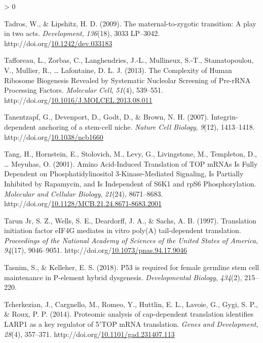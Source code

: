 \documentclass[12pt,oneside]{reedthesis}
\newlength{\cslhangindent}
\newenvironment{CSLReferences}[2] %
 {%
  \setlength{\parindent}{0pt}
  \ifodd #1 \everypar{\setlength{\hangindent}{\cslhangindent}}\ignorespaces\fi
  \ifnum #2 > 0
  \setlength{\parskip}{#2\baselineskip}
  \fi
 }%
 {}
\begin{document}
\begin{CSLReferences}{1}{0}
\leavevmode\hypertarget{ref-Tadros2009c}{}%
Tadros, W., \& Lipshitz, H. D. (2009). The maternal-to-zygotic transition: A play in two acts. \emph{Development}, \emph{136}(18), 3033 LP--3042. http://doi.org/\href{https://doi.org/10.1242/dev.033183}{10.1242/dev.033183}

\leavevmode\hypertarget{ref-Tafforeau2013a}{}%
Tafforeau, L., Zorbas, C., Langhendries, J.-L., Mullineux, S.-T., Stamatopoulou, V., Mullier, R., \ldots{} Lafontaine, D. L. J. (2013). The {Complexity} of {Human Ribosome Biogenesis Revealed} by {Systematic Nucleolar Screening} of {Pre}-{rRNA Processing Factors}. \emph{Molecular Cell}, \emph{51}(4), 539--551. http://doi.org/\href{https://doi.org/10.1016/J.MOLCEL.2013.08.011}{10.1016/J.MOLCEL.2013.08.011}

\leavevmode\hypertarget{ref-tanentzapfIntegrindependentAnchoringStemcell2007}{}%
Tanentzapf, G., Devenport, D., Godt, D., \& Brown, N. H. (2007). Integrin-dependent anchoring of a stem-cell niche. \emph{Nature Cell Biology}, \emph{9}(12), 1413--1418. http://doi.org/\href{https://doi.org/10.1038/ncb1660}{10.1038/ncb1660}

\leavevmode\hypertarget{ref-tangAminoAcidInducedTranslation2001}{}%
Tang, H., Hornstein, E., Stolovich, M., Levy, G., Livingstone, M., Templeton, D., \ldots{} Meyuhas, O. (2001). Amino {Acid}-{Induced Translation} of {TOP mRNAs Is Fully Dependent} on {Phosphatidylinositol} 3-{Kinase}-{Mediated Signaling}, {Is Partially Inhibited} by {Rapamycin}, and {Is Independent} of {S6K1} and {rpS6 Phosphorylation}. \emph{Molecular and Cellular Biology}, \emph{21}(24), 8671--8683. http://doi.org/\href{https://doi.org/10.1128/MCB.21.24.8671-8683.2001}{10.1128/MCB.21.24.8671-8683.2001}

\leavevmode\hypertarget{ref-TarunJr1997l}{}%
Tarun Jr, S. Z., Wells, S. E., Deardorff, J. A., \& Sachs, A. B. (1997). Translation initiation factor {eIF4G} mediates in vitro poly({A}) tail-dependent translation. \emph{Proceedings of the National Academy of Sciences of the United States of America}, \emph{94}(17), 9046--9051. http://doi.org/\href{https://doi.org/10.1073/pnas.94.17.9046}{10.1073/pnas.94.17.9046}

\leavevmode\hypertarget{ref-Tasnim2018a}{}%
Tasnim, S., \& Kelleher, E. S. (2018). P53 is required for female germline stem cell maintenance in {P}-element hybrid dysgenesis. \emph{Developmental Biology}, \emph{434}(2), 215--220.

\leavevmode\hypertarget{ref-Tcherkezian2014b}{}%
Tcherkezian, J., Cargnello, M., Romeo, Y., Huttlin, E. L., Lavoie, G., Gygi, S. P., \& Roux, P. P. (2014). Proteomic analysis of cap-dependent translation identifies {LARP1} as a key regulator of 5{\({'}\)}{TOP mRNA} translation. \emph{Genes and Development}, \emph{28}(4), 357--371. http://doi.org/\href{https://doi.org/10.1101/gad.231407.113}{10.1101/gad.231407.113}


\end{CSLReferences}
\end{document}
